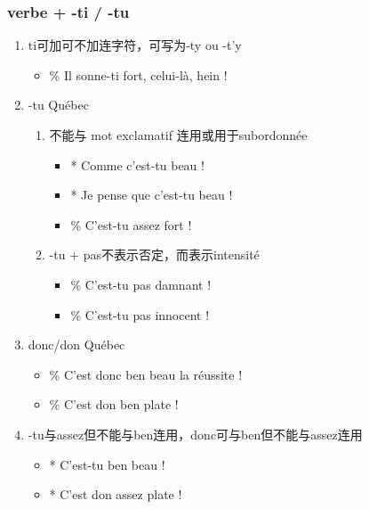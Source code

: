 \documentclass[UTF8]{report}
\begin{document}
\subsubsection{verbe + -ti / -tu}
\begin{enumerate}
    \item ti可加可不加连字符，可写为-ty ou -t’y
    \begin{itemize}
        \item \% Il sonne-ti fort, celui-là, hein ! 
    \end{itemize}
    \item -tu Québec
    \begin{enumerate}
        \item 不能与 mot exclamatif 连用或用于subordonnée
        \begin{itemize}
            \item * Comme c’est-tu beau !
            \item * Je pense que c’est-tu beau !
            \item \% C’est-tu assez fort !
        \end{itemize}
        \item -tu + pas不表示否定，而表示intensité
        \begin{itemize}
            \item \% C’est-tu pas damnant !
            \item \% C’est-tu pas innocent !
        \end{itemize}
    \end{enumerate}
    \item donc/don Québec
    \begin{itemize}
        \item \% C’est donc ben beau la réussite !
        \item \% C’est don ben plate ! 
    \end{itemize}
    \item -tu与assez但不能与ben连用，donc可与ben但不能与assez连用
    \begin{itemize}
        \item * C’est-tu ben beau !
        \item * C’est don assez plate !
    \end{itemize}
\end{enumerate}
\end{document}
